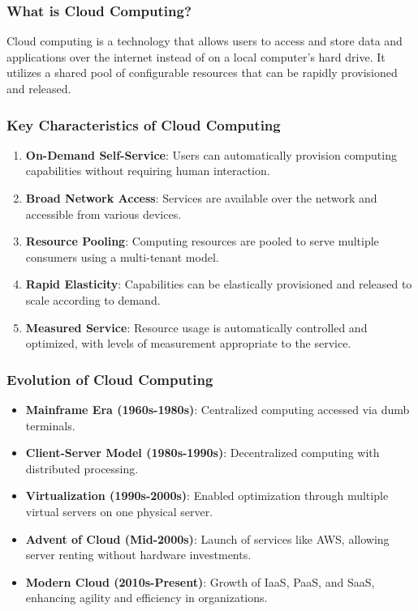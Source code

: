 \documentclass[aspectratio=169]{beamer}
\begin{document}
\begin{frame}[fragile]
    \frametitle{What is Cloud Computing?}
    Cloud computing is a technology that allows users to access and store data and applications over the internet instead of on a local computer's hard drive. It utilizes a shared pool of configurable resources that can be rapidly provisioned and released.
\end{frame}

\begin{frame}[fragile]
    \frametitle{Key Characteristics of Cloud Computing}
    \begin{enumerate}
        \item \textbf{On-Demand Self-Service}: Users can automatically provision computing capabilities without requiring human interaction.
        \item \textbf{Broad Network Access}: Services are available over the network and accessible from various devices.
        \item \textbf{Resource Pooling}: Computing resources are pooled to serve multiple consumers using a multi-tenant model.
        \item \textbf{Rapid Elasticity}: Capabilities can be elastically provisioned and released to scale according to demand.
        \item \textbf{Measured Service}: Resource usage is automatically controlled and optimized, with levels of measurement appropriate to the service.
    \end{enumerate}
\end{frame}

\begin{frame}[fragile]
    \frametitle{Evolution of Cloud Computing}
    \begin{itemize}
        \item \textbf{Mainframe Era (1960s-1980s)}: Centralized computing accessed via dumb terminals.
        \item \textbf{Client-Server Model (1980s-1990s)}: Decentralized computing with distributed processing.
        \item \textbf{Virtualization (1990s-2000s)}: Enabled optimization through multiple virtual servers on one physical server.
        \item \textbf{Advent of Cloud (Mid-2000s)}: Launch of services like AWS, allowing server renting without hardware investments.
        \item \textbf{Modern Cloud (2010s-Present)}: Growth of IaaS, PaaS, and SaaS, enhancing agility and efficiency in organizations.
    \end{itemize}
\end{frame}
\end{document}
